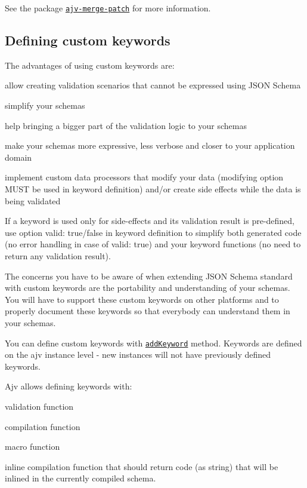 See the package \href{https://github.com/epoberezkin/ajv-merge-patch}{\tt ajv-\/merge-\/patch} for more information.

\subsection*{Defining custom keywords}

The advantages of using custom keywords are\+:


\begin{DoxyItemize}
\item allow creating validation scenarios that cannot be expressed using J\+S\+ON Schema
\item simplify your schemas
\item help bringing a bigger part of the validation logic to your schemas
\item make your schemas more expressive, less verbose and closer to your application domain
\item implement custom data processors that modify your data ({\ttfamily modifying} option M\+U\+ST be used in keyword definition) and/or create side effects while the data is being validated
\end{DoxyItemize}

If a keyword is used only for side-\/effects and its validation result is pre-\/defined, use option {\ttfamily valid\+: true/false} in keyword definition to simplify both generated code (no error handling in case of {\ttfamily valid\+: true}) and your keyword functions (no need to return any validation result).

The concerns you have to be aware of when extending J\+S\+ON Schema standard with custom keywords are the portability and understanding of your schemas. You will have to support these custom keywords on other platforms and to properly document these keywords so that everybody can understand them in your schemas.

You can define custom keywords with \href{#api-addkeyword}{\tt add\+Keyword} method. Keywords are defined on the {\ttfamily ajv} instance level -\/ new instances will not have previously defined keywords.

Ajv allows defining keywords with\+:
\begin{DoxyItemize}
\item validation function
\item compilation function
\item macro function
\item inline compilation function that should return code (as string) that will be inlined in the currently compiled schema.
\end{DoxyItemize}

